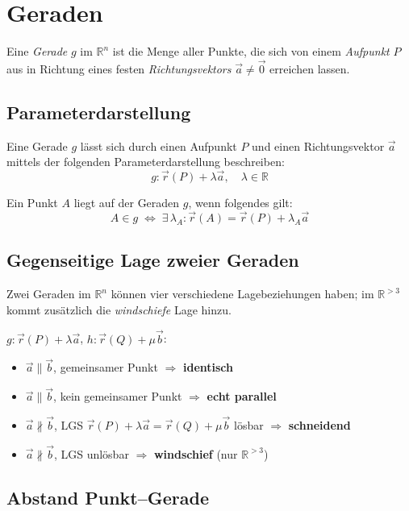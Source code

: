 \section{Geraden}

Eine \emph{Gerade} $g$ im $\mathbb{R}^n$ ist die Menge aller Punkte, die sich von einem \emph{Aufpunkt} $P$ aus in Richtung eines festen \emph{Richtungsvektors} $\vec{a} \neq \vec{0}$ erreichen lassen.

\subsection{Parameterdarstellung}
Eine Gerade $g$ lässt sich durch einen Aufpunkt $P$ und einen Richtungsvektor $\vec{a}$ mittels der folgenden Parameterdarstellung beschreiben:
\[
    g\colon \vec r(P) + \lambda \vec a, \quad \lambda \in \mathbb{R}
\]


Ein Punkt $A$ liegt auf der Geraden $g$, wenn folgendes gilt:
\[
    A \in g \;\Leftrightarrow\; \exists\,\lambda_A\colon \vec r(A) = \vec r(P) + \lambda_A \vec a
\]

\subsection{Gegenseitige Lage zweier Geraden}

Zwei Geraden im $\mathbb{R}^n$ können vier verschiedene Lagebeziehungen haben; im $\mathbb{R}^{>3}$ kommt zusätzlich die \emph{windschiefe} Lage hinzu.

$g\colon \vec r(P) + \lambda\vec a$, \; $h\colon \vec r(Q) + \mu\vec b$:

\begin{itemize}[leftmargin=*, itemsep=0pt]
    \item $\vec a \parallel \vec b$, gemeinsamer Punkt $\Rightarrow$ \textbf{identisch}
    \item $\vec a \parallel \vec b$, kein gemeinsamer Punkt $\Rightarrow$ \textbf{echt parallel}
    \item $\vec a \nparallel \vec b$, LGS $\vec r(P)+\lambda\vec a = \vec r(Q)+\mu\vec b$ lösbar $\Rightarrow$ \textbf{schneidend}
    \item $\vec a \nparallel \vec b$, LGS unlösbar $\Rightarrow$ \textbf{windschief} (nur $\mathbb{R}^{>3}$)
\end{itemize}

\subsection{Abstand Punkt–Gerade}

